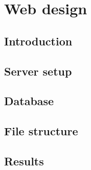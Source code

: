 \chapter{Web design}
\section{Introduction}
\section{Server setup}
\section{Database}
\section{File structure}
\section{Results}








